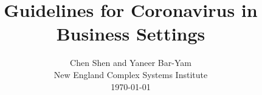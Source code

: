\documentclass[onecolumn,journal]{IEEEtran}
\begin{document}
\title{\color{Brown}  Guidelines for Coronavirus in Business Settings
\vspace{-0.35ex}}
\author{Chen Shen and Yaneer Bar-Yam \\ New England Complex Systems Institute \\
 \today 
  \vspace{-8ex} \\ 
\textbf{}
 }
    
\maketitle




\thispagestyle{empty} %





\end{document}
